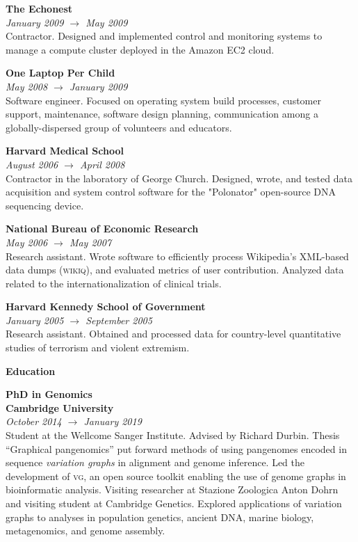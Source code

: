 \documentclass[11pt,hidelinks,letterpaper]{article}
\begin{document}

\hfill \break
\noindent
{\large \bf The Echonest} \\
\emph{January 2009 $\to$ May 2009} \\
Contractor. Designed and implemented control and monitoring systems to manage a compute cluster deployed in the Amazon EC2 cloud.

\hfill \break
\noindent
{\large \bf One Laptop Per Child} \\
\emph{May 2008 $\to$ January 2009} \\
Software engineer. Focused on operating system build processes, customer support, maintenance, software design planning, communication among a globally-dispersed group of volunteers and educators.

\hfill \break
\noindent
{\large \bf Harvard Medical School} \\
\emph{August 2006 $\to$ April 2008} \\
Contractor in the laboratory of George Church. Designed, wrote, and tested data acquisition and system control software for the "Polonator" open-source DNA sequencing device.

\hfill \break
\noindent
{\large \bf National Bureau of Economic Research} \\
\emph{May 2006 $\to$ May 2007} \\
Research assistant. Wrote software to efficiently process Wikipedia's XML-based data dumps (\textsc{wikiq}), and evaluated metrics of user contribution. Analyzed data related to the internationalization of clinical trials.

\hfill \break
\noindent
{\large \bf Harvard Kennedy School of Government} \\
\emph{January 2005 $\to$ September 2005} \\
Research assistant. Obtained and processed data for country-level quantitative studies of terrorism and violent extremism.

\hfill \break
\hfill \break
\noindent
{\LARGE \bf Education}

\hfill \break
\noindent
{\large \bf PhD in Genomics \\
  Cambridge University
} \\
\emph{October 2014 $\to$ January 2019} \\
\noindent
Student at the Wellcome Sanger Institute.
Advised by Richard Durbin.
Thesis ``Graphical pangenomics'' put forward methods of using pangenomes encoded in sequence \emph{variation graphs} in alignment and genome inference.
Led the development of \textsc{vg}, an open source toolkit enabling the use of genome graphs in bioinformatic analysis.
Visiting researcher at Stazione Zoologica Anton Dohrn and visiting student at Cambridge Genetics.
Explored applications of variation graphs to analyses in population genetics, ancient DNA, marine biology, metagenomics, and genome assembly.
\end{document}
